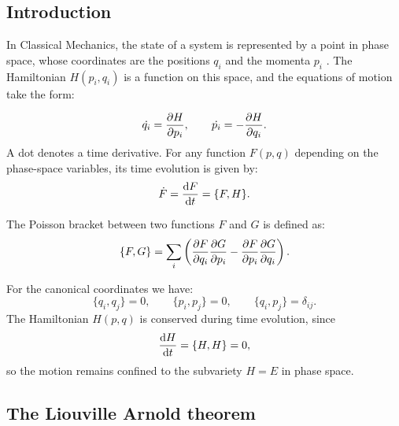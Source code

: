 \subsection{Introduction}\label{subsec:Introduction}
In Classical Mechanics, the state of a system is represented by a point in phase space, whose coordinates are the positions $q_i$ and the momenta $p_i$ \cite{babelon2003introduction,perelomov1990integrable}.  
The Hamiltonian $H(p_i, q_i)$ is a function on this space, and the equations of motion take the form:

\begin{equation} \label{eq:Hamilton}
    \dot{q_i} = \pdv{H}{p_i}, \qquad \dot{p_i} = -\pdv{H}{q_i}.
\end{equation}
A dot denotes a time derivative. For any function $F(p, q)$ depending on the phase-space variables, its time evolution is given by:
\begin{equation}
    \dot{F} = \dv{F}{t} = \{F,H\}.
\end{equation}
\begin{definition}
    The Poisson bracket between two functions $F$ and $G$ is defined as:
    \begin{equation}
        \{F, G\} = \sum_i \left(
        \pdv{F}{q_i} \pdv{G}{p_i} -
        \pdv{F}{p_i} \pdv{G}{q_i}
        \right).
    \end{equation}
\end{definition}
For the canonical coordinates we have:
\begin{equation} \label{eq:Foundamental_Poisson}
    \{q_i, q_j\} = 0, \qquad
    \{p_i, p_j\} = 0, \qquad
    \{q_i, p_j\} = \delta_{ij}.
\end{equation}
The Hamiltonian $H(p, q)$ is conserved during time evolution, since
\begin{equation}
    \dv{H}{t} = \{H,H\} = 0,
\end{equation}
so the motion remains confined to the subvariety $H = E$ in phase space.


\subsection{The Liouville Arnold theorem}

